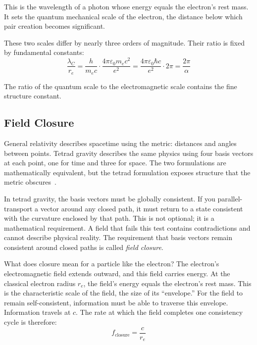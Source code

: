 \documentclass[aps,prd,preprint,superscriptaddress,showpacs,preprintnumbers,amsmath,amssymb,nofootinbib]{revtex4-2}
\begin{document}
This is the wavelength of a photon whose energy equals the electron's rest mass. It sets the quantum mechanical scale of the electron, the distance below which pair creation becomes significant.

These two scales differ by nearly three orders of magnitude. Their ratio is fixed by fundamental constants:
\begin{equation}
\frac{\lambda_C}{r_e} = \frac{h}{m_e c} \cdot \frac{4\pi\varepsilon_0 m_e c^2}{e^2} = \frac{4\pi\varepsilon_0 \hbar c}{e^2} \cdot 2\pi = \frac{2\pi}{\alpha}
\end{equation}

The ratio of the quantum scale to the electromagnetic scale contains the fine structure constant.

\subsection{Field Closure}
\label{subsec:rates}

General relativity describes spacetime using the metric: distances and angles between points. Tetrad gravity describes the same physics using four basis vectors at each point, one for time and three for space. The two formulations are mathematically equivalent, but the tetrad formulation exposes structure that the metric obscures~\cite{paper6}.

In tetrad gravity, the basis vectors must be globally consistent. If you parallel-transport a vector around any closed path, it must return to a state consistent with the curvature enclosed by that path. This is not optional; it is a mathematical requirement. A field that fails this test contains contradictions and cannot describe physical reality. The requirement that basis vectors remain consistent around closed paths is called \emph{field closure}.

What does closure mean for a particle like the electron? The electron's electromagnetic field extends outward, and this field carries energy. At the classical electron radius $r_e$, the field's energy equals the electron's rest mass. This is the characteristic scale of the field, the size of its ``envelope.'' For the field to remain self-consistent, information must be able to traverse this envelope. Information travels at $c$. The rate at which the field completes one consistency cycle is therefore:
\begin{equation}
f_{\text{closure}} = \frac{c}{r_e}
\end{equation}
\end{document}
